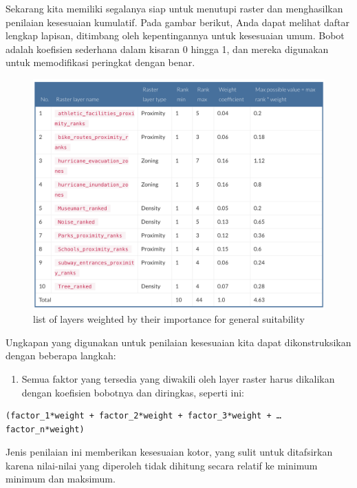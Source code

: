 \documentclass[]{book}
\providecommand{\tightlist}{%
  \setlength{\itemsep}{0pt}\setlength{\parskip}{0pt}}
\begin{document}
Sekarang kita memiliki segalanya siap untuk menutupi raster dan menghasilkan penilaian kesesuaian kumulatif. Pada gambar berikut, Anda dapat melihat daftar lengkap lapisan, ditimbang oleh kepentingannya untuk kesesuaian umum. Bobot adalah koefisien sederhana dalam kisaran 0 hingga 1, dan mereka digunakan untuk memodifikasi peringkat dengan benar.

\begin{figure}

{\centering \includegraphics[width=0.9\linewidth]{images/04/fig40} 

}

\caption{list of layers weighted by their importance for general suitability}\label{fig:fig1440}
\end{figure}

Ungkapan yang digunakan untuk penilaian kesesuaian kita dapat dikonstruksikan dengan beberapa langkah:

\begin{enumerate}
\def\labelenumi{\arabic{enumi}.}
\tightlist
\item
  Semua faktor yang tersedia yang diwakili oleh layer raster harus dikalikan dengan koefisien bobotnya dan diringkas, seperti ini:
\end{enumerate}

\begin{verbatim}
(factor_1*weight + factor_2*weight + factor_3*weight + … factor_n*weight)
\end{verbatim}

Jenis penilaian ini memberikan kesesuaian kotor, yang sulit untuk ditafsirkan karena nilai-nilai yang diperoleh tidak dihitung secara relatif ke minimum minimum dan maksimum.
\end{document}
